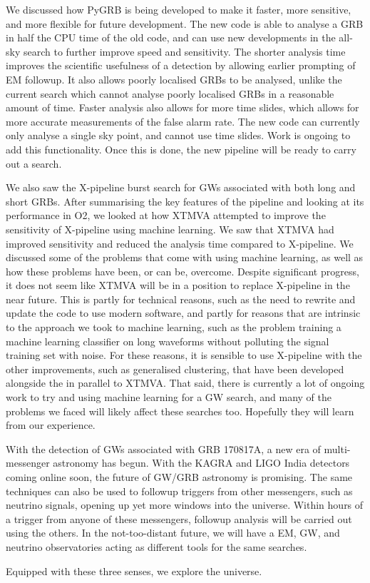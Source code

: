 \documentclass[11pt]{cuthesis}
\newcommand{\xp}{X-pipeline }
\begin{document}
We discussed how PyGRB is being developed to make it faster, more sensitive, and more flexible for future development. The new code is able to analyse a GRB in half the CPU time of the old code, and can use new developments in the all-sky search to further improve speed and sensitivity. The shorter analysis time improves the scientific usefulness of a detection by allowing earlier prompting of EM followup. It also allows poorly localised GRBs to be analysed, unlike the current search which cannot analyse poorly localised GRBs in a reasonable amount of time. Faster analysis also allows for more time slides, which allows for more accurate measurements of the false alarm rate. The new code can currently only analyse a single sky point, and cannot use time slides. Work is ongoing to add this functionality. Once this is done, the new pipeline will be ready to carry out a search. 

We also saw the \xp burst search for GWs associated with both long and short GRBs. After summarising the key features of the pipeline and looking at its performance in O2, we looked at how XTMVA attempted to improve the sensitivity of \xp using machine learning. We saw that XTMVA had improved sensitivity and reduced the analysis time compared to X-pipeline. We discussed some of the problems that come with using machine learning, as well as how these problems have been, or can be, overcome. Despite significant progress, it does not seem like XTMVA will be in a position to replace \xp in the near future. This is partly for technical reasons, such as the need to rewrite and update the code to use modern software, and partly for reasons that are intrinsic to the approach we took to machine learning, such as the problem training a machine learning classifier on long waveforms without polluting the signal training set with noise. For these reasons, it is sensible to use \xp with the other improvements, such as generalised clustering, that have been developed alongside the in parallel to XTMVA. That said, there is currently a lot of ongoing work to try and using machine learning for a GW search, and many of the problems we faced will likely affect these searches too. Hopefully they will learn from our experience.

With the detection of GWs associated with GRB 170817A, a new era of multi-messenger astronomy has begun. With the KAGRA and LIGO India detectors coming online soon, the future of GW/GRB astronomy is promising. The same techniques can also be used to followup triggers from other messengers, such as neutrino signals, opening up yet more windows into the universe. Within hours of a trigger from anyone of these messengers, followup analysis will be carried out using the others. In the not-too-distant future, we will have a EM, GW, and neutrino observatories acting as different tools for the same searches. 
\begin{center}

Equipped with these three senses, we explore the universe.

\end{center}
\end{document}
